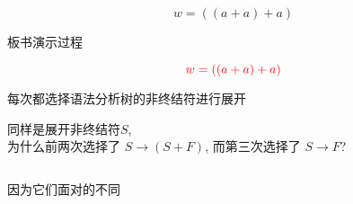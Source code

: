\begin{frame}{}
  \begin{center}
    
    \[
      w = ((a + a) + a)
    \]
  \end{center}
\end{frame}

\begin{frame}{}
  \begin{center}
    板书演示过程


    \vspace{-1.00cm}
    \[
      \textcolor{red}{w = ((a + a) + a)}
    \]

    \pause
    每次都选择语法分析树的非终结符进行展开
  \end{center}
\end{frame}

%
%

%
%

\begin{frame}{}
  \begin{center}
    同样是展开非终结符$S$, \\[4pt]
    为什么前两次选择了 $S \to (S + F)$, 而第三次选择了 $S \to F$?

    \begin{columns}
        
    \end{columns}

    \pause
    \vspace{0.50cm}
    因为它们面对的不同
  \end{center}
\end{frame}

